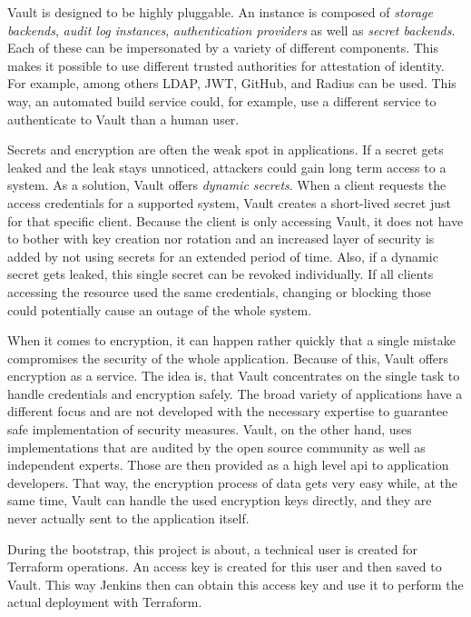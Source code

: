 Vault is designed to be highly pluggable.
An instance is composed of \emph{storage backends}, \emph{audit log instances}, \emph{authentication providers} as well as \emph{secret backends}.
Each of these can be impersonated by a variety of different components.
This makes it possible to use different trusted authorities for attestation of identity.
For example, among others LDAP, JWT, GitHub, and Radius can be used.
This way, an automated build service could, for example, use a different service to authenticate to Vault than a human user.

Secrets and encryption are often the weak spot in applications.
If a secret gets leaked and the leak stays unnoticed, attackers could gain long term access to a system.
As a solution, Vault offers \emph{dynamic secrets}.
When a client requests the access credentials for a supported system, Vault creates a short-lived secret just for that specific client.
Because the client is only accessing Vault, it does not have to bother with key creation nor rotation and an increased layer of security is added by not using secrets for an extended period of time.
Also, if a dynamic secret gets leaked, this single secret can be revoked individually.
If all clients accessing the resource used the same credentials, changing or blocking those could potentially cause an outage of the whole system.

When it comes to encryption, it can happen rather quickly that a single mistake compromises the security of the whole application.
Because of this, Vault offers encryption as a service.
The idea is, that Vault concentrates on the single task to handle credentials and encryption safely.
The broad variety of applications have a different focus and are not developed with the necessary expertise to guarantee safe implementation of security measures.
Vault, on the other hand, uses implementations that are audited by the open source community as well as independent experts.
Those are then provided as a high level \ac{api} to application developers.
That way, the encryption process of data gets very easy while, at the same time, Vault can handle the used encryption keys directly, and they are never actually sent to the application itself. \cite{vaultproject.io}

During the bootstrap, this project is about, a technical user is created for Terraform operations.
An access key is created for this user and then saved to Vault.
This way Jenkins then can obtain this access key and use it to perform the actual deployment with Terraform.

